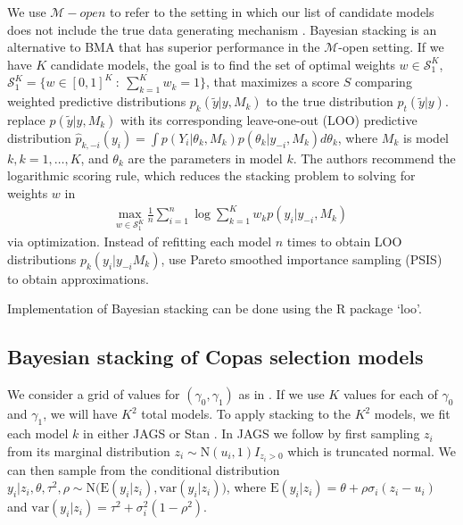 \documentclass[12pt]{article}   	%
\numberwithin{equation}{section}
\begin{document}
We use $\mathcal{M}-open$ to refer to the setting in which our list of candidate models does not include the true data generating mechanism \citep{bernardo2009}. Bayesian stacking \citep{yao2018stacking} is an alternative to BMA that has superior performance in the $\mathcal{M}$-open setting. If we have $K$ candidate models, the goal is to find the set of optimal weights $w \in \mathcal{S}_1^K$, $\mathcal{S}_1^K = \{w \in [0,1]^K \: : \: \sum_{k = 1}^K w_k = 1\}$, that maximizes a score $S$ comparing weighted predictive distributions  $p_k(\tilde{y} \vert y, M_k)$ to the true distribution $p_t(\tilde{y} \vert y)$. \citet{yao2018stacking} replace $p(\tilde{y} \vert y, M_k)$ with its corresponding leave-one-out (LOO) predictive distribution $\hat{p}_{k, -i}(y_i) = \int p(Y_i \vert \theta_k, M_k) p(\theta_k \vert y_{-i}, M_k) d\theta_k$, where $M_k$ is model $k, k = 1, \dots, K$, and $\theta_k$ are the parameters in model $k$. The authors recommend the logarithmic scoring rule, which reduces the stacking problem to solving for weights $w$ in 
\begin{align}
\underset{w \in \mathcal{S}_1^K}{\mbox{max}} \: \frac{1}{n} \sum_{i = 1}^n \log \sum_{k = 1}^K w_k p(y_i \vert y_{-i}, M_k)
\end{align}
via optimization. Instead of refitting each model $n$ times to obtain LOO distributions ${p}_{k}(y_i \vert y_{-i} M_k)$, \citet{yao2018stacking} use Pareto smoothed importance sampling (PSIS) \citep{vehtari2017psis} to obtain approximations. 



Implementation of Bayesian stacking can be done using the R package `loo'. 

\subsection{Bayesian stacking of Copas selection models}

We consider a grid of values for $(\gamma_0, \gamma_1)$ as in \citet{copas2001sensitivity}. If we use $K$ values for each of $\gamma_0$ and $\gamma_1$, we will have $K^2$ total models. To apply stacking to the $K^2$ models, we fit each model $k$ in either JAGS \citep{plummer2003jags} or Stan \citep{gelman2015stan}. In JAGS we follow \citet{mavridis2013copas} by first sampling $z_i$ from its marginal distribution $z_i \sim \mbox{N}(u_i, 1) I_{z_i > 0}$ which is truncated normal. We can then sample from the conditional distribution $y_i \vert z_i, \theta, \tau^2, \rho \sim \mbox{N} \big( \mbox{E}(y_i \vert z_i), \mbox{var}(y_i \vert z_i) \big)$, where $\mbox{E}(y_i \vert z_i) = \theta + \rho \sigma_i (z_i - u_i)$ and $\mbox{var}(y_i \vert z_i) = \tau^2 + \sigma_i^2(1 - \rho^2)$. 
\end{document}

